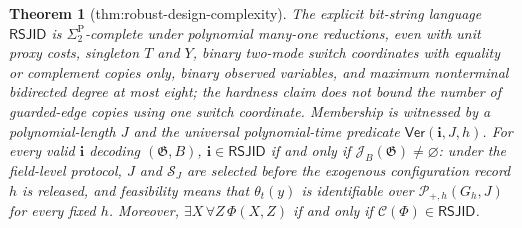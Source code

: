 \documentclass{article}
\newtheorem{theorem}{Theorem}
\begin{document}
\begin{theorem}[thm:robust-design-complexity]\label{thm:robust-design-complexity}
The explicit bit-string language \(\mathsf{RSJID}\) is \(\Sigma_2^{\mathrm P}\)-complete under polynomial many-one reductions, even with unit proxy costs, singleton \(T\) and \(Y\), binary two-mode switch coordinates with equality or complement copies only, binary observed variables, and maximum nonterminal bidirected degree at most eight; the hardness claim does not bound the number of guarded-edge copies using one switch coordinate. Membership is witnessed by a polynomial-length \(J\) and the universal polynomial-time predicate \(\mathsf{Ver}(\mathbf i,J,h)\). For every valid \(\mathbf i\) decoding \((\mathfrak G,B)\), \(\mathbf i\in\mathsf{RSJID}\) if and only if \(\mathcal J_B(\mathfrak G)\ne\varnothing\): under the field-level protocol, \(J\) and \(\mathcal S_J\) are selected before the exogenous configuration record \(h\) is released, and feasibility means that \(\theta_t(y)\) is identifiable over \(\mathcal P_{+,h}(G_h,J)\) for every fixed \(h\). Moreover, \(\exists X\,\forall Z\,\Phi(X,Z)\) if and only if \(\mathcal C(\Phi)\in\mathsf{RSJID}\).
\end{theorem}
\end{document}
